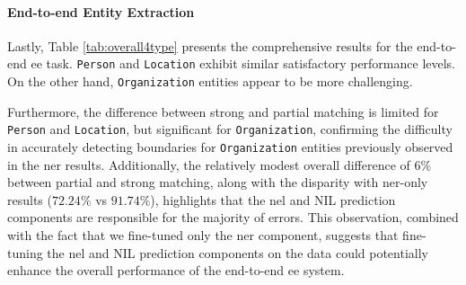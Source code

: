 


\paragraph{End-to-end Entity Extraction}

Lastly, Table \ref{tab:overall4type} presents the comprehensive results for the end-to-end \ac{ee} task. \texttt{Person} and \texttt{Location} exhibit similar satisfactory performance levels. On the other hand, \texttt{Organization} entities appear to be more challenging.

Furthermore, the difference between strong and partial matching is limited for \texttt{Person} and \texttt{Location}, but significant for \texttt{Organization}, confirming the difficulty in accurately detecting boundaries for \texttt{Organization} entities previously observed in the \ac{ner} results. Additionally, the relatively modest overall difference of $6\%$ between partial and strong matching, along with the disparity with \ac{ner}-only results ($72.24\%$ vs $91.74\%$), highlights that the \ac{nel} and NIL prediction components are responsible for the majority of errors. This observation, combined with the fact that we fine-tuned only the \ac{ner} component, suggests that fine-tuning the \ac{nel} and NIL prediction components on the data could potentially enhance the overall performance of the end-to-end \ac{ee} system.




\clearpage